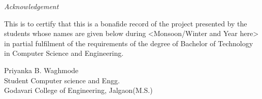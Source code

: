 \newpage
\thispagestyle{empty}

\begin{center}
\emph{\LARGE Acknowledgement}\\[2.5cm]
\end{center}

\normalsize This is to certify that this is a bonafide record of the project presented by the students whose names are given below during <Monsoon/Winter and Year here> in partial fulfilment of the requirements of the degree of Bachelor of Technology in Computer Science and Engineering.\\[1.0cm]





\begin{flushright}
Priyanka B. Waghmode\\
Student Computer science and Engg.\\
Godavari College of Engineering, Jalgaon(M.S.) 
\end{flushright}

